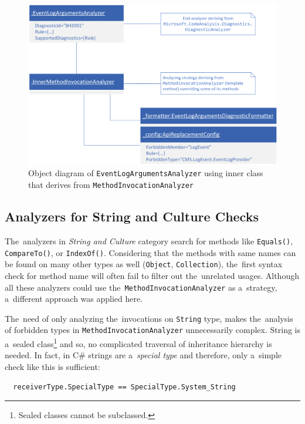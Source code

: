 \documentclass[
  digital, %
  table,   %
  lof,     %
  lot,     %
  oneside,
]{fithesis3}
\begin{document}
\begin{figure}[h!]
		\centering
			\includegraphics[scale=0.75]{img/uml/method-invocation-analyzer-object-diagram}
		\caption{Object diagram of \texttt{EventLogArgumentsAnalyzer} using inner class that derives from \texttt{MethodInvocationAnalyzer}}
		\label{fig:uml-method-invocation-analyzer-object-diagram}
\end{figure}

\subsection{Analyzers for String and Culture Checks}
\label{sec:string-and-culture-approach-explained}
The~analyzers in \textit{String and Culture} category search for methods like \texttt{Equals()}, \texttt{CompareTo()}, or \texttt{IndexOf()}. Considering that the methods with same names can be found on many other types as well (\texttt{Object}, \texttt{Collection}), the~first syntax check for method name will often fail to filter out the~unrelated usages. Although all these analyzers could use the~\texttt{MethodInvocationAnalyzer} as a~strategy, a~different approach was applied here. 

The~need of only analyzing the~invocations on \texttt{String} type, makes the~analysis of forbidden types in \texttt{MethodInvocationAnalyzer} unnecessarily complex. String is a~sealed class\footnote{Sealed classes cannot be subclassed.} and so, no complicated traversal of inheritance hierarchy is needed. In fact, in C\# strings are a~\textit{special type} and therefore, only a~simple check like this is sufficient:

\begin{verbatim}
  receiverType.SpecialType == SpecialType.System_String
\end{verbatim}
\end{document}
